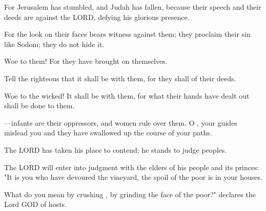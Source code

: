 \documentclass[11pt]{article}
\begin{document}
\begin{biblicaloutline}[Isaiah 3:8-15]


\begin{versesection}{2em}
 For Jerusalem has stumbled,
\poetryline and Judah has fallen,
because their speech and their deeds are against the LORD,
\poetryline defying his glorious presence.

 For the look on their faces bears witness against them;
\poetryline they proclaim their sin like Sodom;
\poetryline they do not hide it.
\end{versesection}


\begin{versesection}{2em}
 Woe to them!
\poetryline For they have brought  on themselves.

 Tell the righteous that it shall be  with them,
\poetryline for they shall  of their deeds.

 Woe to the wicked! It shall be  with them,
\poetryline for what their hands have dealt out shall be done to them.

 —infants are their oppressors,
\poetryline and women rule over them.
O , your guides mislead you
\poetryline and they have swallowed up the course of your paths.
\end{versesection}


\begin{versesection}{2em}
 The LORD has taken his place to contend;
\poetryline he stands to judge peoples.

 The LORD will enter into judgment
\poetryline with the elders of his people and its princes:
"It is you who have devoured the vineyard,
\poetryline the spoil of the poor is in your houses.

 What do you mean by crushing ,
\poetryline by grinding the face of the poor?"
declares the Lord GOD of hosts.
\end{versesection}

\end{biblicaloutline}
\end{document}
